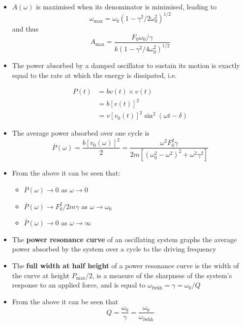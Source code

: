 \documentclass{article}
\begin{document}
\begin{itemize}
  \item $A(\omega)$ is maximised when its denominator is minimised, leading to \[\omega_\text{max} = \omega_0 (1 - \gamma^2 / 2 \omega_0^2)^{1 / 2}\] and thus \[A_\text{max} = \frac{F_0 \omega_0 / \gamma}{k (1 - \gamma^2 / 4 \omega_0^2)^{1 / 2}}\]

  \item The power absorbed by a damped oscillator to sustain its motion is exactly equal to the rate at which the energy is dissipated, i.e.

        \begin{align*}
          P(t) & = b v(t) \times v(t)                      \\
               & = b [v(t)]^2                              \\
               & = v [v_0(t)]^2 \sin^2 (\omega t - \delta)
        \end{align*}

  \item The average power absorbed over one cycle is \[\overline{P}(\omega) = \frac{b[v_0(\omega)]^2}{2} = \frac{\omega^2 F_0^2 \gamma}{2 m [(\omega_0^2 - \omega^2)^2 + \omega^2 \gamma^2]}\]

  \item From the above it can be seen that:

        \begin{itemize}
          \item $\overline{P}(\omega) \rightarrow 0$ as $\omega \rightarrow 0$

          \item $\overline{P}(\omega) \rightarrow F_0^2 / 2 m \gamma$ as $\omega \rightarrow \omega_0$

          \item $\overline{P}(\omega) \rightarrow 0$ as $\omega \rightarrow \infty$
        \end{itemize}

  \item The \textbf{power resonance curve} of an oscillating system graphs the average power absorbed by the system over a cycle to the driving frequency

  \item The \textbf{full width at half height} of a power resonance curve is the width of the curve at height $P_\text{max} / 2$, is a measure of the sharpness of the system's response to an applied force, and is equal to $\omega_\text{fwhh} = \gamma = \omega_0 / Q$

  \item From the above it can be seen that \[Q = \frac{\omega_0}{\gamma} = \frac{\omega_0}{\omega_\text{fwhh}}\]


\end{itemize}
\end{document}
